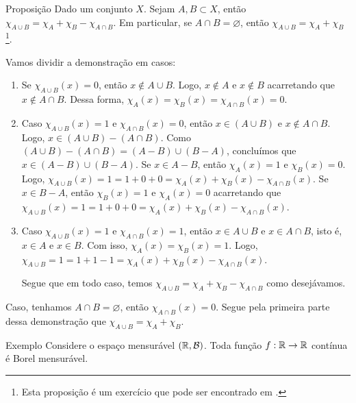 \begin{env}{Proposição}
	\label{prop: propriedades de função característica}
	Dado um conjunto $X$. 
	Sejam $A, B \subset X$, então $\chi_{A\cup B} = \chi_A + \chi_B - \chi_{A \cap B}$.
	Em particular, se $A \cap B = \varnothing$, então $\chi_{A\cup B} = \chi_A + \chi_B$
	\footnote{Esta proposição é um exercício que pode ser encontrado em \cite[p.57]{elon}.}.
\end{env}
\begin{prova}
	Vamos dividir a demonstração em casos:
	\begin{enumerate}[label*=(\Roman*)]
		\item Se $\chi_{A\cup B}(x) = 0$, então $ x \notin A\cup B$. 
		Logo,  $x \notin A$ e $x \notin B$ acarretando que $x \notin A\cap B$.
		Dessa forma, $\chi_A(x) = \chi_B(x) =\chi_{A\cap B}(x) = 0$.
		\item Caso $\chi_{A\cup B}(x) = 1$ e $\chi_{A\cap B}(x) = 0$, então $x \in (A\cup B)$ e $x \notin A\cap B$.
		Logo, $x \in (A\cup B) - (A\cap B)$.
		Como $(A\cup B) - (A\cap B) = (A- B) \cup (B - A)$, concluímos que $x \in (A - B) \cup (B - A)$.
		Se $x \in A - B$, então $\chi_{A}(x) = 1$ e $\chi_B(x) = 0$.
		Logo, 	$\chi_{A\cup B}(x) = 1 = 1 + 0 + 0 = \chi_A(x) + \chi_B(x) - \chi_{A\cap B}(x)$.
		Se $x \in B - A$, então $\chi_B(x) = 1$ e $\chi_A(x) = 0$ acarretando que 
		$\chi_{A\cup B}(x) = 1 = 1 + 0 + 0 = \chi_A(x) + \chi_B(x) - \chi_{A\cap B}(x)$.
		\item Caso $\chi_{A\cup B}(x) = 1$ e $\chi_{A\cap B}(x) = 1$, então
		$x \in A \cup B$ e $x \in A \cap B$, isto é, $x \in A$ e $x \in B$.
		Com isso, $\chi_A(x) = \chi_B(x) = 1$.
		Logo, $\chi_{A\cup B} = 1 = 1 + 1 - 1 = \chi_A(x) + \chi_B(x) - \chi_{A\cap B}(x)$.
		
		Segue que em todo caso, temos $\chi_{A \cup B} = \chi_A + \chi_B - \chi_{A\cap B}$ como desejávamos.
	\end{enumerate}
	
	Caso, tenhamos $A \cap B = \varnothing$, então $\chi_{A\cap B}(x) = 0$. 
	Segue pela primeira parte dessa demonstração que $\chi_{A \cup B} = \chi_A + \chi_B$.
	
	\end{prova}
	\begin{env}{Exemplo}
	\label{ex:função-continua-mensuravel}
	    Considere o espaço mensurável $(\mathbb{R}, \operatorname{\mathcal{B}})$. Toda função $f: \mathbb{R} \to \mathbb{R}$ contínua é Borel mensurável.
	    \vspace{-0.2cm}
	\end{env}
	
